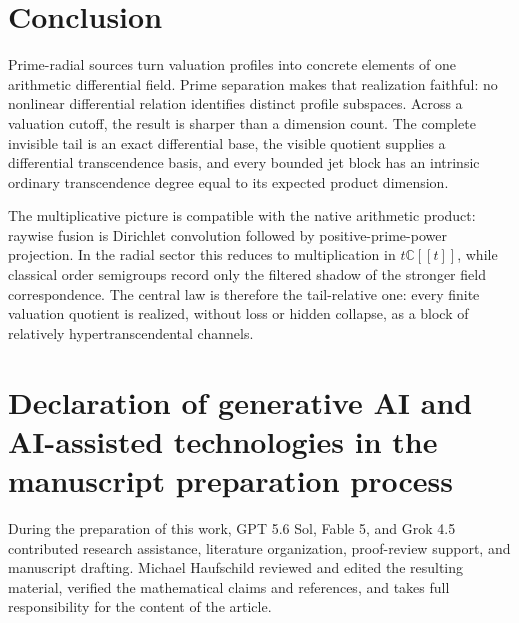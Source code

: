 \documentclass[11pt]{article}
\theoremstyle{definition}
\theoremstyle{remark}
\newcommand{\C}{\mathbb C}
\begin{document}
\section{Conclusion}

Prime-radial sources turn valuation profiles into concrete elements of one arithmetic
differential field.  Prime separation makes that realization faithful: no nonlinear differential
relation identifies distinct profile subspaces.  Across a valuation cutoff, the result is sharper
than a dimension count.  The complete invisible tail is an exact differential base, the visible
quotient supplies a differential transcendence basis, and every bounded jet block has an
intrinsic ordinary transcendence degree equal to its expected product dimension.

The multiplicative picture is compatible with the native arithmetic product: raywise fusion is
Dirichlet convolution followed by positive-prime-power projection.  In the radial sector this
reduces to multiplication in $t\C[[t]]$, while classical order semigroups record only the filtered
shadow of the stronger field correspondence.  The central law is therefore the tail-relative
one: every finite valuation quotient is realized, without loss or hidden collapse, as a block of
relatively hypertranscendental channels.

\section*{Declaration of generative AI and AI-assisted technologies in the manuscript preparation process}

During the preparation of this work, GPT 5.6 Sol, Fable 5, and Grok 4.5 contributed research
assistance, literature organization, proof-review support, and manuscript drafting. Michael
Haufschild reviewed and edited the resulting material, verified the mathematical claims and
references, and takes full responsibility for the content of the article.
\end{document}
